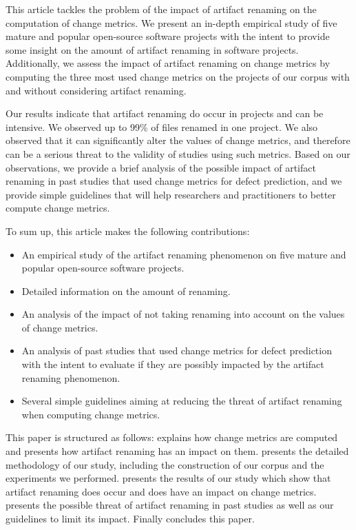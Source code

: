 This article tackles the problem of the impact of artifact renaming on the computation of change metrics. We present an in-depth empirical study of five mature and popular open-source software projects with the intent to provide some insight on the amount of artifact renaming in software projects. Additionally, we assess the impact of artifact renaming on change metrics by computing the three most used change metrics on the projects of our corpus with and without considering artifact renaming.

Our results indicate that artifact renaming do occur in projects and can be intensive. We observed up to 99\% of files renamed in one project. We also observed that it can significantly alter the values of change metrics, and therefore can be a serious threat to the validity of studies using such metrics. Based on our observations, we provide a brief analysis of the possible impact of artifact renaming in past studies that used change metrics for defect prediction, and we provide simple guidelines that will help researchers and practitioners to better compute change metrics.

To sum up, this article makes the following contributions:
\begin{itemize}
	\item An empirical study of the artifact renaming phenomenon on five mature and popular open-source software projects.
	\item Detailed information on the amount of renaming.
	\item An analysis of the impact of not taking renaming into account on the values of change metrics.
	\item An analysis of past studies that used change metrics for defect prediction with the intent to evaluate if they are possibly impacted by the artifact renaming phenomenon.
	\item Several simple guidelines aiming at reducing the threat of artifact renaming when computing change metrics.
\end{itemize}

This paper is structured as follows:  explains how change metrics are computed and presents how artifact renaming has an impact on them.  presents the detailed methodology of our study, including the construction of our corpus and the experiments we performed.  presents the results of our study which show that artifact renaming does occur and does have an impact on change metrics.  presents the possible threat of artifact renaming in past studies as well as our guidelines to limit its impact. Finally  concludes this paper.
